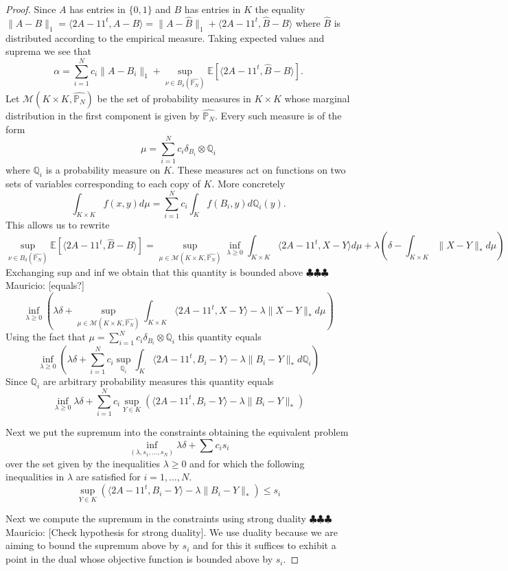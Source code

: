 \documentclass[12pt]{amsart}
\numberwithin{equation}{section}
\newcommand{\EE}{\mathbb{E}}
\newcommand{\mv}[1]{{\color{red} \sf $\clubsuit\clubsuit\clubsuit$ Mauricio: [#1]}}
\begin{document}
\begin{proof} Since $A$ has entries in $\{0,1\}$ and $B$ has entries in $K$ the equality $\|A-B\|_1=\langle 2A-11^t, A-B\rangle=\|A-\hat{B}\|_1+\langle 2A-11^t, \hat{B}-B\rangle$ where $\hat{B}$ is distributed according to the empirical measure. Taking expected values and suprema we see that
\[\alpha=\sum_{i=1}^N c_i\|A-B_i\|_1+\sup_{\nu\in B_{\delta}(\hat{\mathbb{P}_N})}\EE\left[\langle 2A-11^t, \hat{B}-B\rangle\right].\] 
Let $\mathcal{M}(K\times K,\hat{\mathbb{P}_N})$ be the set of probability measures in $K\times K$ whose marginal distribution in the first component is given by $\hat{\mathbb{P}_N}$. Every such measure is of the form 
\[\mu = \sum_{i=1}^N c_i \delta_{B_i}\otimes \mathbb{Q}_i\]
where $\mathbb{Q}_i$ is a probability measure on $K$. These measures act on functions on two sets of variables corresponding to each copy of $K$. More concretely
\[\int_{K\times K} f(x,y) d\mu = \sum_{i=1}^ N c_i \int_K f(B_i,y)d\mathbb{Q}_i(y).\]
This allows us to rewrite
\[\sup_{\nu\in B_{\delta}(\hat{\mathbb{P}_N})}\EE\left[\langle 2A-11^t, \hat{B}-B\rangle\right] = 
\sup_{\mu\in \mathcal{M}(K\times K, \hat{\mathbb{P}_N})} \inf_{\lambda\geq 0} \int_{K\times K}\langle 2A-11^t, X-Y\rangle d\mu +\lambda\left(\delta -\int_{K\times K} \|X-Y\|_*d\mu\right)\]
Exchanging sup and inf we obtain that this quantity is bounded above \mv{equals?}
\[\inf_{\lambda\geq 0} \left(\lambda \delta +\sup_{\mu\in \mathcal{M}(K\times K, \hat{\mathbb{P}_N})}\int_{K\times K} \langle 2A-11^t, X-Y\rangle -\lambda \|X-Y\|_*d\mu\right)\]
Using the fact that $\mu = \sum_{i=1}^N c_i \delta_{B_i}\otimes \mathbb{Q}_i$ this quantity equals
\[\inf_{\lambda\geq 0} \left(\lambda\delta + \sum_{i=1}^N c_i \sup_{\mathbb{Q}_i} \int_{K} \langle 2A-11^t, B_i-Y\rangle -\lambda \|B_i-Y\|_*d\mathbb{Q}_i\right)\]
Since $\mathbb{Q}_i$ are arbitrary probability measures this quantity equals
\[\inf_{\lambda\geq 0} \lambda \delta +\sum_{i=1}^N c_i \sup_{Y\in K} \left(\langle 2A-11^t, B_i-Y\rangle -\lambda \|B_i-Y\|_*\right)\]

Next we put the supremum into the constraints obtaining the equivalent problem
\[ \inf_{(\lambda,s_1,\dots, s_N)} \lambda\delta +\sum c_is_i\]
over the set given by the inequalities $\lambda\geq 0$ and for which the following inequalities in $\lambda$ are satisfied for $i=1,\dots, N$.
\[\sup_{Y\in K} \left(\langle 2A-11^t, B_i-Y\rangle -\lambda \|B_i-Y\|_*\right)\leq s_i\]


Next we compute the supremum in the constraints using strong duality \mv{Check hypothesis for strong duality}. We use duality because we are aiming to bound  the supremum above by $s_i$ and for this it suffices to exhibit a point in the dual whose objective function is bounded above by $s_i$. 


\end{proof}
\end{document}
